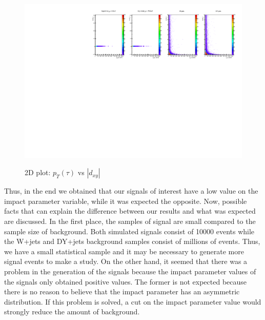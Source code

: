  \begin{figure}[h] 
 \centering
 \caption{2D plot: $p_T(\tau)$ vs $|d_{xy}|$}
 \includegraphics[width=1.15\textwidth]{./Capitulos/Analysis/ipt1_pt} 
 \label{ipt1_pt}
 \end{figure}
 
 
Thus, in the end we obtained that our signals of interest have a low value on the impact parameter variable, while it was expected the opposite. Now, possible facts that can explain the difference between our results and what was expected are discussed. In the first place, the samples of signal are small compared to the sample size of background. Both simulated signals consist of 10000 events while the W+jets and DY+jets background samples consist of millions of events. Thus, we have a small statistical sample and it may be necessary to generate more signal events to make a study. On the other hand, it seemed that there was a problem in the generation of the signals because the impact parameter values of the signals only obtained positive values. The former is not expected because there is no reason to believe that the impact parameter has an asymmetric distribution. If this problem is solved, a cut on the impact parameter value would strongly reduce the amount of background.




